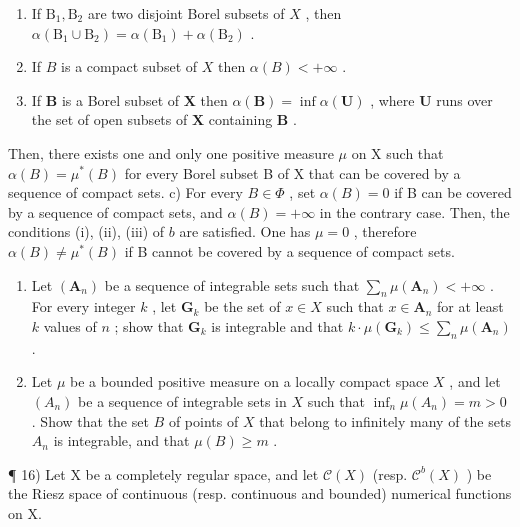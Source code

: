 \begin{enumerate}
\def\labelenumi{(\roman{enumi})}
\item
  If \(\mathrm{B}_1, \mathrm{B}_2\) are two disjoint Borel subsets of \(X\) , then \(\alpha(\mathrm{B}_1 \cup \mathrm{B}_2) = \alpha(\mathrm{B}_1) + \alpha(\mathrm{B}_2)\) .\\
\item
  If \(B\) is a compact subset of \(X\) then \(\alpha(B) < +\infty\) .
\item
  If \(\mathbf{B}\) is a Borel subset of \(\mathbf{X}\) then \(\alpha(\mathbf{B}) = \inf \alpha(\mathbf{U})\) , where \(\mathbf{U}\) runs over the set of open subsets of \(\mathbf{X}\) containing \(\mathbf{B}\) .
\end{enumerate}

Then, there exists one and only one positive measure \(\mu\) on X such that \(\alpha(B) = \mu^{*}(B)\) for every Borel subset B of X that can be covered by a sequence of compact sets. c) For every \(B \in \Phi\) , set \(\alpha(B) = 0\) if B can be covered by a sequence of compact sets, and \(\alpha(B) = +\infty\) in the contrary case. Then, the conditions (i), (ii), (iii) of \(b\) are satisfied. One has \(\mu = 0\) , therefore \(\alpha(B) \neq \mu^{*}(B)\) if B cannot be covered by a sequence of compact sets.

\begin{enumerate}
\def\labelenumi{\arabic{enumi})}
\setcounter{enumi}{13}
\item
  Let \((\mathbf{A}_n)\) be a sequence of integrable sets such that \(\sum_{n} \mu(\mathbf{A}_n) < +\infty\) . For every integer \(k\) , let \(\mathbf{G}_k\) be the set of \(x \in X\) such that \(x \in \mathbf{A}_n\) for at least \(k\) values of \(n\) ; show that \(\mathbf{G}_k\) is integrable and that \(k \cdot \mu(\mathbf{G}_k) \leqslant \sum_{n} \mu(\mathbf{A}_n)\) .
\item
  Let \(\mu\) be a bounded positive measure on a locally compact space \(X\) , and let \((A_n)\) be a sequence of integrable sets in \(X\) such that \(\inf_{n} \mu(A_n) = m > 0\) . Show that the set \(B\) of points of \(X\) that belong to infinitely many of the sets \(A_n\) is integrable, and that \(\mu(B) \geqslant m\) .
\end{enumerate}

¶ 16) Let X be a completely regular space, and let \(\mathcal{C}(X)\) (resp. \(\mathcal{C}^b(X)\) ) be the Riesz space of continuous (resp. continuous and bounded) numerical functions on X.

